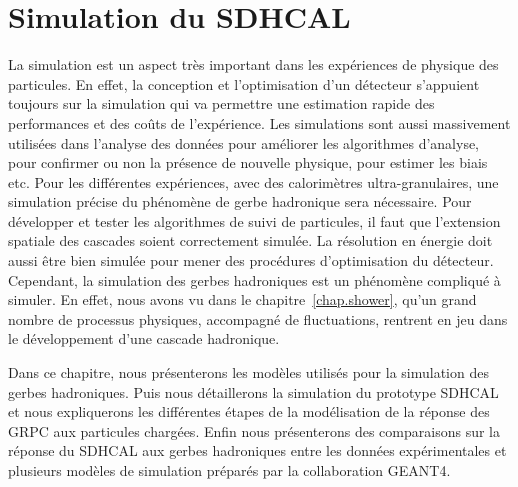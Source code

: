 \chapter{Simulation du SDHCAL}
\label{chap.simulation}
La simulation est un aspect très important dans les expériences de physique des particules. En effet, la conception et l'optimisation d'un détecteur s'appuient toujours sur la simulation qui va permettre une estimation rapide des performances et des coûts de l'expérience. Les simulations sont aussi massivement utilisées dans l'analyse des données pour améliorer les algorithmes d'analyse, pour confirmer ou non la présence de nouvelle physique, pour estimer les biais etc. Pour les différentes expériences, avec des calorimètres ultra-granulaires, une simulation précise du phénomène de gerbe hadronique sera nécessaire. Pour développer et tester les algorithmes de suivi de particules, il faut que l'extension spatiale des cascades soient correctement simulée. La résolution en énergie doit aussi être bien simulée pour mener des procédures d'optimisation du détecteur. Cependant, la simulation des gerbes hadroniques est un phénomène compliqué à simuler. En effet, nous avons vu dans le chapitre~\ref{chap.shower}, qu'un grand nombre de processus physiques, accompagné de fluctuations, rentrent en jeu dans le développement d'une cascade hadronique. 

Dans ce chapitre, nous présenterons les modèles utilisés pour la simulation des gerbes hadroniques. Puis nous détaillerons la simulation du prototype SDHCAL et nous expliquerons les différentes étapes de la modélisation de la réponse des GRPC aux particules chargées. Enfin nous présenterons des comparaisons sur la réponse du SDHCAL aux gerbes hadroniques entre les données expérimentales et plusieurs modèles de simulation préparés par la collaboration GEANT4.
\minitoc
\newpage


